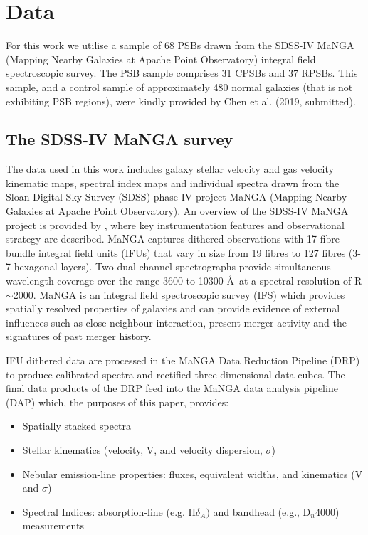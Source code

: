 \section{Data}
\label{sec:data}

For this work we utilise a sample of 68 PSBs drawn from the SDSS-IV MaNGA (Mapping Nearby Galaxies at Apache Point Observatory) integral field spectroscopic survey. The PSB sample comprises 31 CPSBs and 37 RPSBs. This sample, and a control sample of approximately 480 normal galaxies (that is not exhibiting PSB regions),  were kindly provided by Chen et al. (2019, submitted).

\subsection{The SDSS-IV MaNGA survey}
\label{sec:MaNGA}
The data used in this work includes galaxy stellar velocity and gas velocity kinematic maps, spectral index maps and individual spectra drawn from the Sloan Digital Sky Survey (SDSS) phase IV project MaNGA (Mapping Nearby Galaxies at Apache Point Observatory). An overview of the SDSS-IV MaNGA project is provided by \citet{2015ApJ...798....7B}, where key instrumentation features and observational strategy are described. MaNGA captures dithered observations with 17 fibre-bundle integral
field units (IFUs) that vary in size from 19 fibres to 127 fibres (3-7 hexagonal layers). Two dual-channel spectrographs provide
simultaneous wavelength coverage over the range 3600 to 10300 \AA\ at a spectral resolution of R$\sim$2000. MaNGA is an integral field spectroscopic survey (IFS) which provides spatially resolved properties of galaxies and can provide evidence of external influences such as close neighbour interaction, present merger activity and the signatures of past merger history.

IFU dithered data are processed in the MaNGA Data Reduction Pipeline (DRP) to produce calibrated spectra and rectified three-dimensional data cubes. The final data products of the DRP feed into the MaNGA data analysis pipeline (DAP) \citep{2016AJ....152...83L,2019arXiv190100856W} which, the purposes of this paper, provides:
\begin{itemize}
    \item Spatially stacked spectra
    \item Stellar kinematics (velocity, V, and velocity dispersion, $\sigma$)
    \item Nebular emission-line properties: fluxes, equivalent widths, and kinematics (V and $\sigma$)
    \item Spectral Indices: absorption-line (e.g.  H$\delta_A)$ and bandhead (e.g., D$_n$4000) measurements
\end{itemize}

